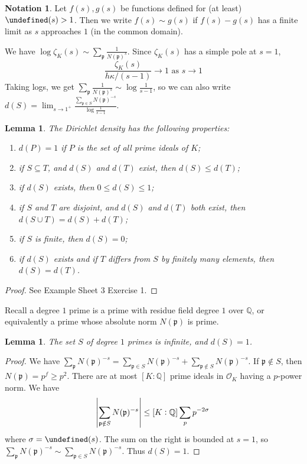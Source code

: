 \documentclass[11pt]{article}
\theoremstyle{definition}
\newtheorem{notation}[definition]{Notation}
\theoremstyle{plain}
\newtheorem{lemma}[definition]{Lemma}
\theoremstyle{remark}
\let\Re\undefined
\DeclareMathOperator{\Re}{Re}
\newcommand{\QQ}{\mathbb{Q}}
\newcommand{\cO}{\mathcal{O}}
\newcommand{\fp}{\mathfrak{p}}
\begin{document}
\begin{notation}\label{not:8_2}
    Let $f(s), g(s)$ be functions defined for (at least) $\Re(s) > 1$. Then we write $f(s) \sim g(s)$ if $f(s) - g(s)$ has a finite limit as $s$ approaches $1$ (in the common domain).
\end{notation}

We have $\log \zeta_K(s) \sim \sum_{\fp} \frac{1}{N(\fp)^s}$. Since $\zeta_K(s)$ has a simple pole at $s=1$,
\begin{equation*}
    \frac{\zeta_K(s)}{h\kappa/(s-1)} \to 1 \text{ as } s \to 1
\end{equation*}
Taking logs, we get $\sum_{\fp} \frac{1}{N(\fp)^s} \sim \log \frac{1}{s-1}$, so we can also write $d(S) = \lim_{s \to 1^+} \frac{\sum_{\fp \in S} N(\fp)^{-s}}{\log \frac{1}{s-1}}$.

\begin{lemma}\label{lem:8_3}
    The Dirichlet density has the following properties:
    \begin{enumerate}[label=\roman*)]
        \item $d(P) = 1$ if $P$ is the set of all prime ideals of $K$;
        \item if $S \subseteq T$, and $d(S)$ and $d(T)$ exist, then $d(S) \le d(T)$;
        \item if $d(S)$ exists, then $0 \le d(S) \le 1$;
        \item if $S$ and $T$ are disjoint, and $d(S)$ and $d(T)$ both exist, then $d(S \cup T) = d(S) + d(T)$;
        \item if $S$ is finite, then $d(S) = 0$;
        \item if $d(S)$ exists and if $T$ differs from $S$ by finitely many elements, then $d(S) = d(T)$.
    \end{enumerate}
\end{lemma}
\begin{proof}
    See Example Sheet 3 Exercise 1.
\end{proof}

Recall a degree $1$ prime is a prime with residue field degree $1$ over $\QQ$, or equivalently a prime whose absolute norm $N(\fp)$ is prime.

\begin{lemma}\label{lem:8_4}
    The set $S$ of degree $1$ primes is infinite, and $d(S) = 1$.
\end{lemma}
\begin{proof}
    We have $\sum_{\fp} N(\fp)^{-s} = \sum_{\fp \in S} N(\fp)^{-s} + \sum_{\fp \notin S} N(\fp)^{-s}$. If $\fp \notin S$, then $N(\fp) = p^f \ge p^2$. There are at most $[K : \QQ]$ prime ideals in $\cO_K$ having a $p$-power norm. We have
    \begin{equation*}
        \abs{\sum_{\fp \notin S} N(\fp)^{-s}} \le [K : \QQ] \sum_{p} p^{-2 \sigma}
    \end{equation*}
    where $\sigma = \Re(s)$. The sum on the right is bounded at $s = 1$, so $\sum_{\fp} N(\fp)^{-s} \sim \sum_{\fp \in S} N(\fp)^{-s}$. Thus $d(S) = 1$.
\end{proof}
\end{document}
